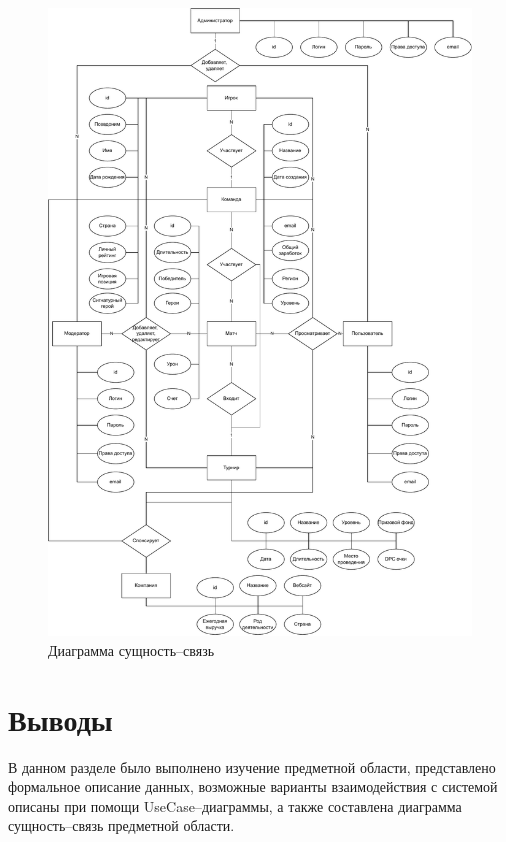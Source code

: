 \begin{figure}[h!btp]
	\centering
	\includegraphics[width=450pt]{inc/diag/chen.pdf}
	\caption{Диаграмма сущность--связь}
	\label{fig:chen}	
\end{figure}

\newpage


\section{Выводы}

В данном разделе было выполнено изучение предметной области, представлено формальное описание данных, возможные варианты взаимодействия с системой описаны при помощи UseCase--диаграммы, а также составлена диаграмма сущность--связь предметной области. 


